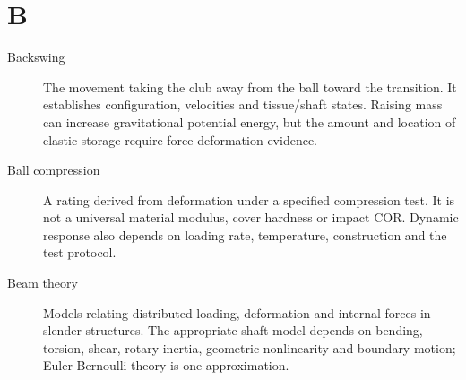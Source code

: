 \section*{B}
\begin{description}

\item[Backswing] The movement taking the club away from the ball toward the transition. It establishes configuration, velocities and tissue/shaft states. Raising mass can increase gravitational potential energy, but the amount and location of elastic storage require force-deformation evidence.

\item[Ball compression] A rating derived from deformation under a specified compression test. It is not a universal material modulus, cover hardness or impact COR. Dynamic response also depends on loading rate, temperature, construction and the test protocol.

\item[Beam theory] Models relating distributed loading, deformation and internal forces in slender structures. The appropriate shaft model depends on bending, torsion, shear, rotary inertia, geometric nonlinearity and boundary motion; Euler-Bernoulli theory is one approximation.

\end{description}
